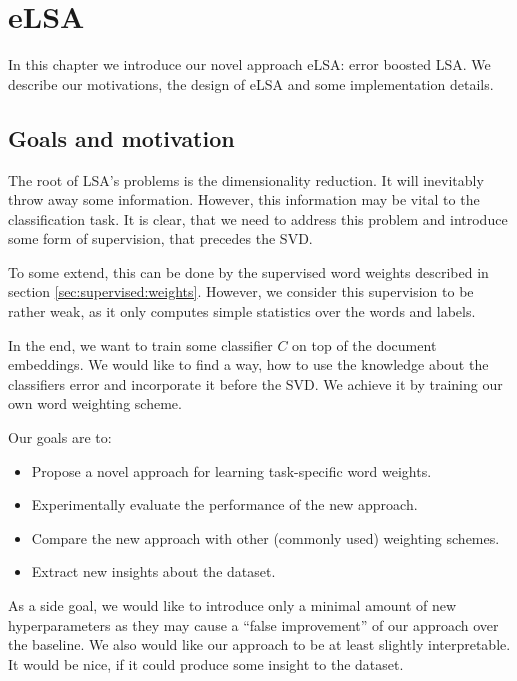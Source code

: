 \chapter{eLSA}

In this chapter we introduce our novel approach eLSA: error boosted LSA.
We describe our motivations, the design of eLSA and some implementation details.

\section{Goals and motivation}

    The root of LSA's problems is the dimensionality reduction.
    It will inevitably throw away some information. 
    However, this information may be vital to the classification task. 
    It is clear, that we need to address this problem and introduce some form of supervision, that precedes the SVD.
    
    To some extend, this can be done by the supervised word weights described in section \ref{sec:supervised:weights}.
    However, we consider this supervision to be rather weak, as it only computes simple statistics over the words and labels.
    
    In the end, we want to train some classifier $C$ on top of the document embeddings.
    We would like to find a way, how to use the knowledge about the classifiers error and incorporate it before the SVD.
    We achieve it by training our own word weighting scheme. 
    
    Our goals are to:
    \begin{itemize}
        \item Propose a novel approach for learning task-specific word weights.
        \item Experimentally evaluate the performance of the new approach.
        \item Compare the new approach with other (commonly used) weighting schemes. 
        \item Extract new insights about the dataset.
    \end{itemize}
    
    As a side goal, we would like to introduce only a minimal amount of new hyperparameters
    as they may cause a ``false improvement'' of our approach over the baseline.
    We also would like our approach to be at least slightly interpretable.
    It would be nice, if it could produce some insight to the dataset.
    
